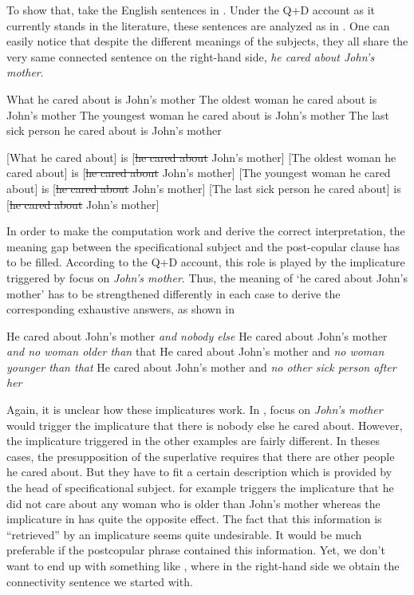 \documentclass[output=paper,colorlinks,citecolor=brown,draft,draftmode]{langscibook}
\begin{document}
To show that, take the English sentences in . Under the  Q+D account as it currently stands in the literature, these sentences are analyzed as in . One can easily notice that despite the different meanings of the subjects, they all share the very same  connected sentence on the right-hand side, \textit{he cared about John's mother}.

\ea \label{englishcases}\ea  What he cared about is John's mother
\ex \label{oldest}The oldest woman he cared about is  John's mother
\ex \label{youngest}The youngest woman he cared about is  John's mother
\ex \label{lastsick}The last sick person he cared about is John's mother
\z
\z

\ea \label{englishcases2}
\ea  {}[What he cared about] is [\sout{he cared about} John's mother]
\ex \label{oldest2}[The oldest woman he cared about] is [\sout{he cared about} John's mother]
\ex {}[The youngest woman he cared about] is [\sout{he cared about} John's mother]
\ex  {}[The last sick person he cared about] is [\sout{he cared about} John's mother]
\z
\z

In order to make the computation work and derive the correct interpretation, the meaning gap between the specificational subject and the post-copular clause has to be filled. According to the Q+D account, this role is played by the implicature triggered by focus on \textit{John's mother}. Thus, the meaning of  `he cared about John's mother' has to be strengthened differently in each case to derive the corresponding exhaustive answers, as shown in 


\ea \label{answers}\ea \label{andnobodyelse}He cared about John's mother \textit{and nobody else}
\ex \label{nowomanolder}He cared about John's mother \textit{and no woman older than} that
\ex \label{nowomanyounger}He cared about John's mother and \textit{no woman younger than that}
\ex  He cared about John's mother and \textit{no other sick person after her}
\z
\z

Again, it is unclear how these implicatures work. In , focus on \textit{John's mother} would trigger the implicature that there is nobody else he cared about. However, the implicature triggered in the other examples are fairly different. In theses cases, the presupposition of the superlative requires that there are other people he cared about. But they have to fit a certain description which is provided by the head of specificational subject.  for example triggers the implicature that he did not care about any woman who is older than John's mother whereas the implicature in  has quite the opposite effect. The fact that this information is ``retrieved'' by an implicature seems quite undesirable. It would be much preferable if the postcopular phrase contained this information. Yet, we don't want to end up with something like , where in the right-hand side we obtain the connectivity sentence we started with.
\end{document}
